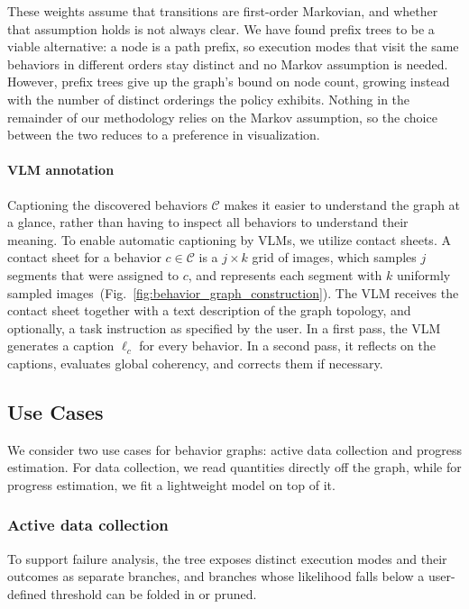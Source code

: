 \documentclass[letterpaper, 10 pt, conference]{ieeeconf}
\begin{document}
These weights assume that transitions are first-order Markovian, and whether that assumption holds is not always clear. We have found prefix trees to be a viable alternative: a node is a path prefix, so execution modes that visit the same behaviors in different orders stay distinct and no Markov assumption is needed. However, prefix trees give up the graph's bound on node count, growing instead with the number of distinct orderings the policy exhibits. Nothing in the remainder of our methodology relies on the Markov assumption, so the choice between the two reduces to a preference in visualization.

\paragraph{VLM annotation}
Captioning the discovered behaviors \(\mathcal{C}\) makes it easier to understand the graph at a glance, rather than having to inspect all behaviors to understand their meaning. To enable automatic captioning by VLMs, we utilize contact sheets. A contact sheet for a behavior \(c \in \mathcal{C}\) is a \(j \times k\) grid of images, which samples \(j\) segments that were assigned to \(c\), and represents each segment with \(k\) uniformly sampled images~(Fig.~\ref{fig:behavior_graph_construction}). The VLM receives the contact sheet together with a text description of the graph topology, and optionally, a task instruction as specified by the user. In a first pass, the VLM generates a caption \(\ell_c\) for every behavior. In a second pass, it reflects on the captions, evaluates global coherency, and corrects them if necessary.
 

\subsection{Use Cases}
\label{subsec:use_cases}
 
We consider two use cases for behavior graphs: active data collection and progress estimation. For data collection, we read quantities directly off the graph, while for progress estimation, we fit a lightweight model on top of it.
 
\subsubsection{Active data collection}
To support failure analysis, the tree exposes distinct execution modes and their outcomes as separate branches, and branches whose likelihood falls below a user-defined threshold can be folded in or pruned.
 
\end{document}
